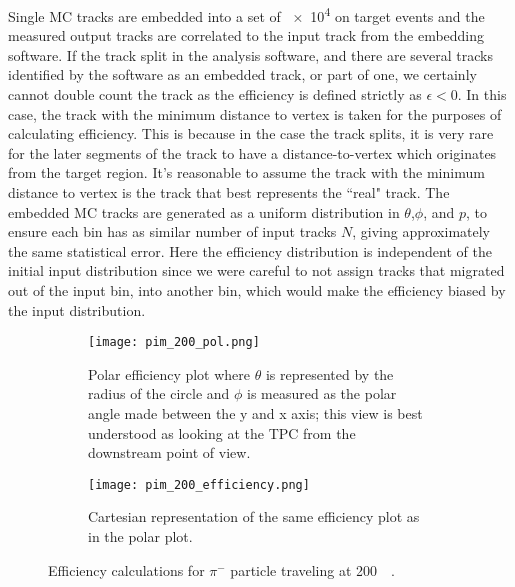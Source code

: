  Single MC tracks are embedded into a set of \num{e4} on target events and the measured output tracks are correlated to the input track from the embedding software. If the track split in the analysis software, and there are several tracks identified by the software as an embedded track, or part of one, we certainly cannot double count the track as the efficiency is  defined strictly as $\epsilon < 0$. In this case, the track with the minimum distance to vertex is taken for the purposes of calculating efficiency. This is because in the case the track splits, it is very rare for the later segments of the track to have a distance-to-vertex which originates from the target region. It's reasonable to assume the track with the minimum distance to vertex is the track that best represents the ``real" track. The embedded MC tracks are generated as a uniform distribution in $\theta$,$\phi$, and $p$, to ensure each bin has as similar number of input tracks $N$, giving approximately the same statistical error. Here the efficiency distribution is independent of the initial input distribution since we were careful to not assign tracks that migrated out of the input bin, into another bin, which would make the efficiency biased by the input distribution. 
 
\begin{figure}[!htb]
    \centering
    \begin{subfigure}[t]{0.49\textwidth}
        \centering
        \texttt{[image: pim\_200\_pol.png]}
        \caption{Polar efficiency plot where $\theta$ is represented by the radius of the circle and $\phi$ is measured as the polar angle made between the y and x axis; this view is  best understood as looking at the TPC from the downstream point of view.} \label{fig:pim_pol_eff_ex}
    \end{subfigure}
    \hfill
    \begin{subfigure}[t]{.49\textwidth}
        \centering
        \texttt{[image: pim\_200\_efficiency.png]} 
        \caption{Cartesian representation of the same efficiency plot  as in the polar plot.} \label{fig:pim_flat_eff_ex}
    \end{subfigure}
  
\caption{Efficiency calculations for $\pi^-$ particle traveling at \SI{200}{\mega\eVperc}.}
\label{fig:pim_eff_ex}
\end{figure}
 
 
 
